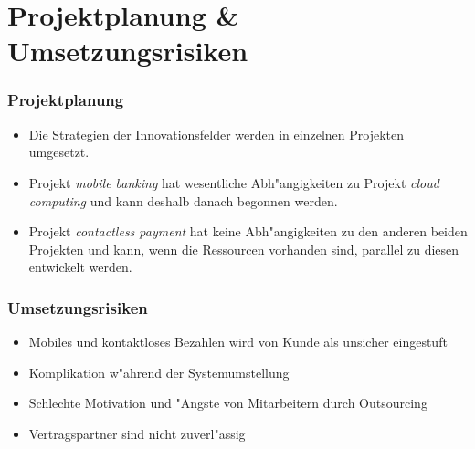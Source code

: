 \documentclass{beamer}
\begin{document}
\section{Projektplanung \& Umsetzungsrisiken}

\begin{frame}[plain]
  \frametitle{Projektplanung}
  \begin{itemize}

	\item Die Strategien der Innovationsfelder werden in einzelnen Projekten umgesetzt.\vspace{2mm}
	
	\item Projekt \textit{mobile banking} hat wesentliche Abh"angigkeiten zu Projekt \textit{cloud computing} und kann deshalb danach begonnen werden. \vspace{2mm}

	\item Projekt \textit{contactless payment} hat keine Abh"angigkeiten zu den anderen beiden Projekten und kann, wenn die Ressourcen vorhanden sind, parallel zu diesen entwickelt werden. \vspace{2mm}

  \end{itemize}
\end{frame}

\begin{frame}[plain]
  \frametitle{Umsetzungsrisiken}
  \begin{itemize}

	\item Mobiles und kontaktloses Bezahlen wird von Kunde als unsicher eingestuft \vspace{2mm}
	\item Komplikation w"ahrend der Systemumstellung\vspace{2mm}
	\item Schlechte Motivation und "Angste von Mitarbeitern durch Outsourcing\vspace{2mm}
	\item Vertragspartner sind nicht zuverl"assig

  \end{itemize}
\end{frame}
\end{document}
